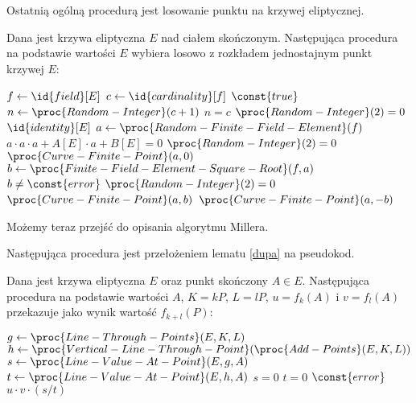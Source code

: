 Ostatnią ogólną procedurą jest losowanie punktu na krzywej eliptycznej.

\begin{algorithm}
Dana jest krzywa eliptyczna $E$ nad ciałem skończonym.
Następująca procedura
na podstawie wartości $E$
wybiera losowo z rozkładem jednostajnym
punkt krzywej $E$:

\begin{codebox}
\li
    $f \gets \id{field}[E]$
\li
    $c \gets \id{cardinality}[f]$
\li
    \While $\const{true}$
\li
        \Do
            $n \gets \proc{Random-Integer}(c + 1)$
\li
            \If $n = c$
\li
                \Then
                    \If $\proc{Random-Integer}(2) = 0$
\li
                        \Then
                            \Return $\id{identity}[E]$
                        \End
\li
                \Else
                    $a \gets \proc{Random-Finite-Field-Element}(f)$
\li
                    \If $a\cdot a\cdot a + A[E]\cdot a + B[E] = 0$
\li
                        \Then
                            \If $\proc{Random-Integer}(2) = 0$
\li
                                \Then
                                    \Return $\proc{Curve-Finite-Point}(a, 0)$
                                \End
\li
                        \Else
                            $b \gets \proc{Finite-Field-Element-Square-Root}(f, a)$
\li
                            \If $b \neq \const{error}$
\li
                                \Then
                                    \If $\proc{Random-Integer}(2) = 0$
\li
                                        \Then
                                            \Return $\proc{Curve-Finite-Point}(a, b)$
\li
                                        \Else
                                            \Return $\proc{Curve-Finite-Point}(a, -b)$
                                        \End
                                \End
                        \End
                \End
        \End
\end{codebox}
\end{algorithm}

Możemy teraz przejść do opisania algorytmu Millera.


Następująca procedura jest przełożeniem lematu \ref{dupa} na pseudokod.

\begin{algorithm}
Dana jest krzywa eliptyczna $E$ oraz punkt skończony $A \in E$.
Następująca procedura
na podstawie wartości $A$, $K = kP$, $L = lP$, $u = f_k(A)$ i $v = f_l(A)$
przekazuje jako wynik
wartość $f_{k+l}(P)$:

\begin{codebox}
\li
    $g \gets \proc{Line-Through-Points}(E, K, L)$
\li
    $h \gets \proc{Vertical-Line-Through-Point}(\proc{Add-Points}(E, K, L))$
\li
    $s \gets \proc{Line-Value-At-Point}(E, g, A)$
\li
    $t \gets \proc{Line-Value-At-Point}(E, h, A)$
\li
    \If $s = 0$  $t = 0$
\li
        \Then \Return $\const{error}$
    \End
\li
    \Return $u \cdot v \cdot (s / t)$
\end{codebox}
\end{algorithm}

